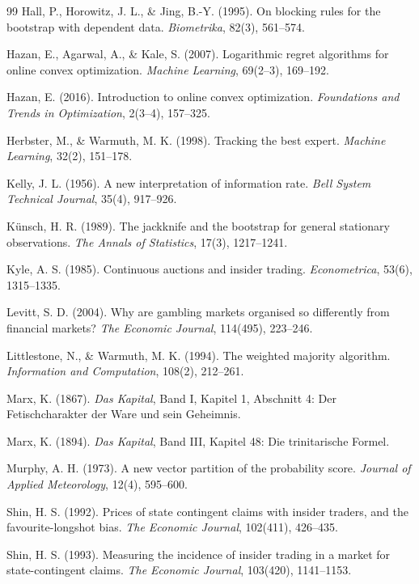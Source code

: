 \documentclass[12pt,a4paper,oneside]{report}
\renewcommand{\_}{\oldunderscore\allowbreak}
\theoremstyle{definition}
\theoremstyle{plain}
\theoremstyle{remark}
\begin{document}
\begin{thebibliography}{99}
 Hall, P., Horowitz, J. L., \& Jing, B.-Y. (1995). On blocking rules for
the bootstrap with dependent data. \emph{Biometrika}, 82(3), 561--574.

 Hazan, E., Agarwal, A., \& Kale, S. (2007). Logarithmic regret
algorithms for online convex optimization. \emph{Machine Learning}, 69(2--3), 169--192.

 Hazan, E. (2016). Introduction to online convex optimization.
\emph{Foundations and Trends in Optimization}, 2(3--4), 157--325.

 Herbster, M., \& Warmuth, M. K. (1998). Tracking the best expert.
\emph{Machine Learning}, 32(2), 151--178.

 Kelly, J. L. (1956). A new interpretation of information rate.
\emph{Bell System Technical Journal}, 35(4), 917--926.

 Künsch, H. R. (1989). The jackknife and the bootstrap for general
stationary observations. \emph{The Annals of Statistics}, 17(3), 1217--1241.

 Kyle, A. S. (1985). Continuous auctions and insider trading.
\emph{Econometrica}, 53(6), 1315--1335.

 Levitt, S. D. (2004). Why are gambling markets organised so differently
from financial markets? \emph{The Economic Journal}, 114(495), 223--246.

 Littlestone, N., \& Warmuth, M. K. (1994). The weighted majority
algorithm. \emph{Information and Computation}, 108(2), 212--261.

 Marx, K. (1867). \emph{Das Kapital}, Band I, Kapitel 1, Abschnitt 4:
Der Fetischcharakter der Ware und sein Geheimnis.

 Marx, K. (1894). \emph{Das Kapital}, Band III, Kapitel 48:
Die trinitarische Formel.

 Murphy, A. H. (1973). A new vector partition of the probability score.
\emph{Journal of Applied Meteorology}, 12(4), 595--600.

 Shin, H. S. (1992). Prices of state contingent claims with insider traders,
and the favourite-longshot bias. \emph{The Economic Journal}, 102(411), 426--435.

 Shin, H. S. (1993). Measuring the incidence of insider trading in a market
for state-contingent claims. \emph{The Economic Journal}, 103(420), 1141--1153.


\end{thebibliography}
\end{document}

